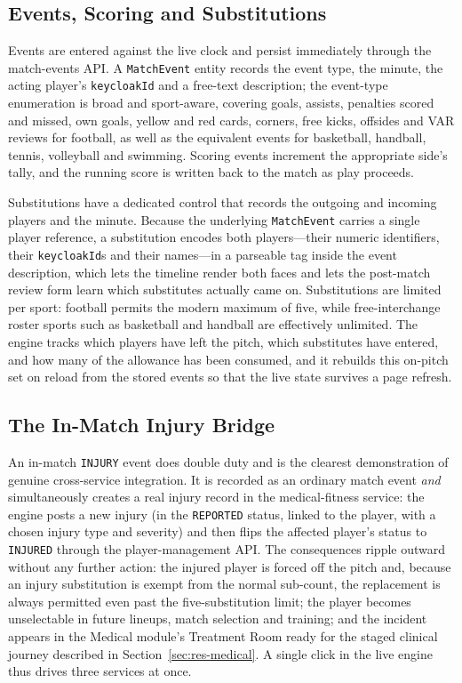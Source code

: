 \subsection{Events, Scoring and Substitutions}
Events are entered against the live clock and persist immediately through the match-events API. A
\texttt{MatchEvent} entity records the event type, the minute, the acting player's \texttt{keycloakId} and
a free-text description; the event-type enumeration is broad and sport-aware, covering goals, assists,
penalties scored and missed, own goals, yellow and red cards, corners, free kicks, offsides and VAR reviews
for football, as well as the equivalent events for basketball, handball, tennis, volleyball and swimming.
Scoring events increment the appropriate side's tally, and the running score is written back to the match as
play proceeds.

Substitutions have a dedicated control that records the outgoing and incoming players and the minute. Because
the underlying \texttt{MatchEvent} carries a single player reference, a substitution encodes both players---their
numeric identifiers, their \texttt{keycloakId}s and their names---in a parseable tag inside the event description,
which lets the timeline render both faces and lets the post-match review form learn which substitutes actually
came on. Substitutions are limited per sport: football permits the modern maximum of five, while free-interchange
roster sports such as basketball and handball are effectively unlimited. The engine tracks which players have left
the pitch, which substitutes have entered, and how many of the allowance has been consumed, and it rebuilds this
on-pitch set on reload from the stored events so that the live state survives a page refresh.

\subsection{The In-Match Injury Bridge}
An in-match \texttt{INJURY} event does double duty and is the clearest demonstration of genuine cross-service
integration. It is recorded as an ordinary match event \emph{and} simultaneously creates a real injury record in
the medical-fitness service: the engine posts a new injury (in the \texttt{REPORTED} status, linked to the player,
with a chosen injury type and severity) and then flips the affected player's status to \texttt{INJURED} through the
player-management API. The consequences ripple outward without any further action: the injured player is forced off
the pitch and, because an injury substitution is exempt from the normal sub-count, the replacement is always
permitted even past the five-substitution limit; the player becomes unselectable in future lineups, match selection
and training; and the incident appears in the Medical module's Treatment Room ready for the staged clinical journey
described in Section~\ref{sec:res-medical}. A single click in the live engine thus drives three services at once.

